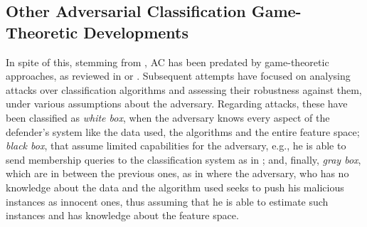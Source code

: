 
\subsection{Other Adversarial Classification Game-Theoretic Developments}\label{sec:other_AC}

In spite of this, stemming from 
\textcite{dalvi2004adversarial}, AC has been predated by game-theoretic approaches, as reviewed in \textcite{biggio2014security} or \textcite{li2014feature}.
Subsequent attempts have focused on analysing attacks over classification algorithms and assessing their robustness against them, %
under various assumptions about the adversary. Regarding attacks, these have been classified as {\em white box}, when
the adversary knows every aspect of the defender's system
like the data used, the algorithms and the entire feature space; 
{\em black box}, that assume limited capabilities for the adversary, e.g., he is able to send membership queries to the classification system as in
\textcite{adversarialLearning2005}; and, finally,
{\em gray box}, which are in between the previous ones, as in \textcite{zhou2012adversarial}
where the adversary, who has no knowledge about the data and the algorithm used
seeks to push his malicious instances
as innocent 
ones, thus assuming that he is able to estimate such instances and has knowledge about the feature space. 

